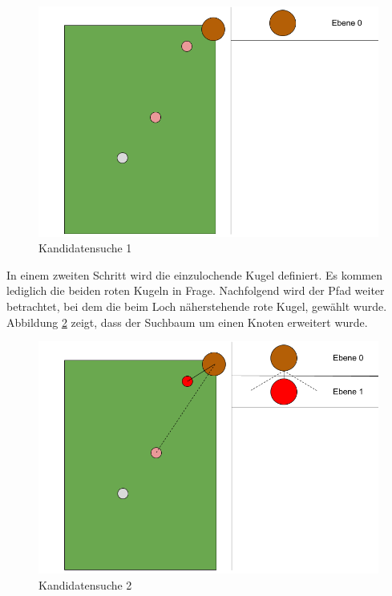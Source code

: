 \begin{figure}[h!]
    \begin{center}
        \includegraphics[width=0.5\linewidth]{../common/03_billiard_ai/resources/11_backwardsearch_1.png}
    \end{center}
    \caption{Kandidatensuche 1}
    \label{fig:backwardsearch_1}
\end{figure}

In einem zweiten Schritt wird die einzulochende Kugel definiert. Es kommen lediglich die beiden roten Kugeln in Frage.
Nachfolgend wird der Pfad weiter betrachtet, bei dem die beim Loch näherstehende rote Kugel, gewählt wurde.
Abbildung \ref{fig:backwardsearch_2} zeigt, dass der Suchbaum um einen Knoten erweitert wurde.
\begin{figure}[h!]
    \begin{center}
        \includegraphics[width=0.5\linewidth]{../common/03_billiard_ai/resources/12_backwardsearch_2.png}
    \end{center}
    \caption{Kandidatensuche 2}
    \label{fig:backwardsearch_2}
\end{figure}

